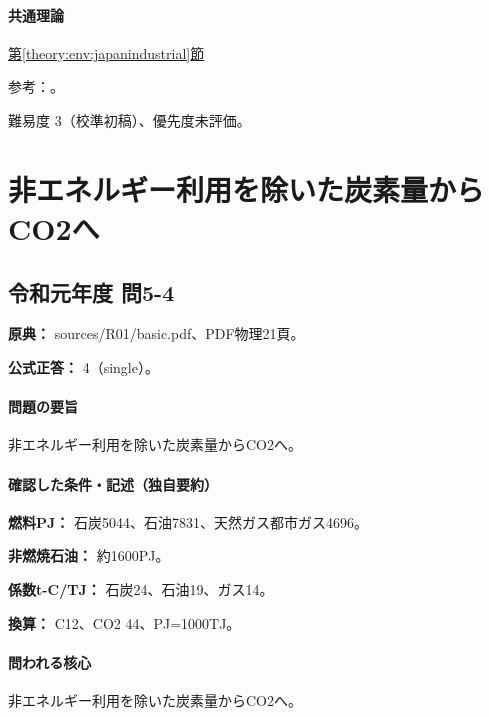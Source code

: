 \paragraph{共通理論} \hyperref[theory:env:japanindustrial]{第\ref*{theory:env:japanindustrial}節}

\par 参考：\cite{env59_juse}。

\par 難易度 3（校準初稿）、優先度未評価。

\section{非エネルギー利用を除いた炭素量からCO2へ}

\subsection{令和元年度 問5-4}
\label{q:r01-reg-basic-5-4}

\noindent\textbf{原典：} sources/R01/basic.pdf、PDF物理21頁。

\textbf{公式正答：} 4（single）。

\paragraph{問題の要旨} 非エネルギー利用を除いた炭素量からCO2へ。

\paragraph{確認した条件・記述（独自要約）}\mbox{}\par

\noindent\textbf{燃料PJ：} 石炭5044、石油7831、天然ガス都市ガス4696。\par

\noindent\textbf{非燃焼石油：} 約1600PJ。\par

\noindent\textbf{係数t-C/TJ：} 石炭24、石油19、ガス14。\par

\noindent\textbf{換算：} C12、CO2 44、PJ=\allowbreak{}1000TJ。\par

\paragraph{問われる核心} 非エネルギー利用を除いた炭素量からCO2へ。

